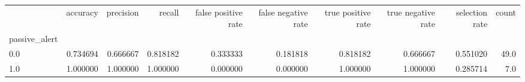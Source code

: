 \begin{tabular}{lrrrrrrrrr}
\toprule
{} &  accuracy &  precision &    recall &  false positive rate &  false negative rate &  true positive rate &  true negative rate &  selection rate &  count \\
passive\_alert &           &            &           &                      &                      &                     &                     &                 &        \\
\midrule
0.0           &  0.734694 &   0.666667 &  0.818182 &             0.333333 &             0.181818 &            0.818182 &            0.666667 &        0.551020 &   49.0 \\
1.0           &  1.000000 &   1.000000 &  1.000000 &             0.000000 &             0.000000 &            1.000000 &            1.000000 &        0.285714 &    7.0 \\
\bottomrule
\end{tabular}
